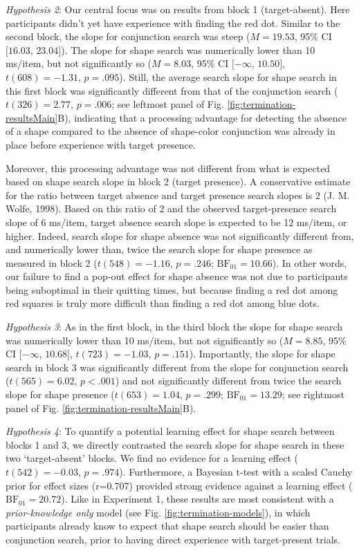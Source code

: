 \documentclass[12pt,twoside]{reedthesis}
\begin{document}
\emph{Hypothesis 2}: Our central focus was on results from block 1 (target-absent). Here participants didn't yet have experience with finding the red dot. Similar to the second block, the slope for conjunction search was steep (\(M = 19.53\), 95\% CI \([16.03\), \(23.04]\)). The slope for shape search was numerically lower than 10 ms/item, but not significantly so (\(M = 8.03\), 95\% CI \([-\infty\), \(10.50]\), \(t(608) = -1.31\), \(p = .095\)). Still, the average search slope for shape search in this first block was significantly different from that of the conjunction search (\(t(326) = 2.77\), \(p = .006\); see leftmost panel of Fig. \ref{fig:termination-resultsMain}B), indicating that a processing advantage for detecting the absence of a shape compared to the absence of shape-color conjunction was already in place before experience with target presence.

Moreover, this processing advantage was not different from what is expected based on shape search slope in block 2 (target presence). A conservative estimate for the ratio between target absence and target presence search slopes is 2 (J. M. Wolfe, 1998). Based on this ratio of 2 and the observed target-presence search slope of 6 ms/item, target absence search slope is expected to be 12 ms/item, or higher. Indeed, search slope for shape absence was not significantly different from, and numerically lower than, twice the search slope for shape presence as measured in block 2 (\(t(548) = -1.16\), \(p = .246\); \(\mathrm{BF}_{\textrm{01}} = 10.66\)). In other words, our failure to find a pop-out effect for shape absence was not due to participants being suboptimal in their quitting times, but because finding a red dot among red squares is truly more difficult than finding a red dot among blue dots.

\emph{Hypothesis 3}: As in the first block, in the third block the slope for shape search was numerically lower than 10 ms/item, but not significantly so (\(M = 8.85\), 95\% CI \([-\infty\), \(10.68]\), \(t(723) = -1.03\), \(p = .151\)). Importantly, the slope for shape search in block 3 was significantly different from the slope for conjunction search (\(t(565) = 6.02\), \(p < .001\)) and not significantly different from twice the search slope for shape presence (\(t(653) = 1.04\), \(p = .299\); \(\mathrm{BF}_{\textrm{01}} = 13.29\); see rightmost panel of Fig. \ref{fig:termination-resultsMain}B).

\emph{Hypothesis 4}: To quantify a potential learning effect for shape search between blocks 1 and 3, we directly contrasted the search slope for shape search in these two `target-absent' blocks. We find no evidence for a learning effect (\(t(542) = -0.03\), \(p = .974\)). Furthermore, a Bayesian t-test with a scaled Cauchy prior for effect sizes (r=0.707) provided strong evidence against a learning effect (\(\mathrm{BF}_{\textrm{01}} = 20.72\)). Like in Experiment 1, these results are most consistent with a \emph{prior-knowledge only} model (see Fig. \ref{fig:termination-models}), in which participants already know to expect that shape search should be easier than conjunction search, prior to having direct experience with target-present trials.
\end{document}
